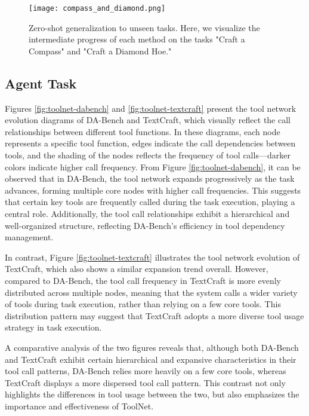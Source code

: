 \begin{figure}[H]
\vskip 0.2in
\begin{center}
\centerline{\texttt{[image: compass\_and\_diamond.png]}}
\caption{Zero-shot generalization to unseen tasks. Here, we visualize the intermediate progress of each method on the tasks "Craft a Compass" and "Craft a Diamond Hoe."}
\label{fig:diamon and compass}
\end{center}
\vskip -0.3in
\end{figure}



\subsection{Agent Task}
\label{subsec:agent-results}

Figures \ref{fig:toolnet-dabench} and \ref{fig:toolnet-textcraft} present the tool network evolution diagrams of DA-Bench and TextCraft, which visually reflect the call relationships between different tool functions. In these diagrams, each node represents a specific tool function, edges indicate the call dependencies between tools, and the shading of the nodes reflects the frequency of tool calls—darker colors indicate higher call frequency. From Figure \ref{fig:toolnet-dabench}, it can be observed that in DA-Bench, the tool network expands progressively as the task advances, forming multiple core nodes with higher call frequencies. This suggests that certain key tools are frequently called during the task execution, playing a central role. Additionally, the tool call relationships exhibit a hierarchical and well-organized structure, reflecting DA-Bench's efficiency in tool dependency management.

In contrast, Figure \ref{fig:toolnet-textcraft} illustrates the tool network evolution of TextCraft, which also shows a similar expansion trend overall. However, compared to DA-Bench, the tool call frequency in TextCraft is more evenly distributed across multiple nodes, meaning that the system calls a wider variety of tools during task execution, rather than relying on a few core tools. This distribution pattern may suggest that TextCraft adopts a more diverse tool usage strategy in task execution.

A comparative analysis of the two figures reveals that, although both DA-Bench and TextCraft exhibit certain hierarchical and expansive characteristics in their tool call patterns, DA-Bench relies more heavily on a few core tools, whereas TextCraft displays a more dispersed tool call pattern. This contrast not only highlights the differences in tool usage between the two, but also emphasizes the importance and effectiveness of ToolNet.





